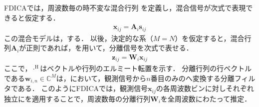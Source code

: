 FDICAでは，周波数毎の時不変な混合行列 を定義し，混合信号が次式で表現できると仮定する．
\begin{align}
 \bm{x}_{ij} = \bm{A}_i\bm{s}_{ij}
\end{align}
この混合モデルは，する．
以後，決定的な系（$M=N$）を仮定すると，混合行列$\bm{A}_{i}$が正則であれば，を用いて，分離信号を次式で表せる．
\begin{align}
 \bm{z}_{ij} = \bm{W}_{i}\bm{x}_{ij} \label{eq:sep}
\end{align}
ここで，$\cdot^\mathrm{H}$はベクトルや行列のエルミート転置を示す．
分離行列の行ベクトルである$\bm{w}_{i,n}\in\mathbb{C}^M$は，において，観測信号から$n$番目のみのへ変換する分離フィルタである．
このようにFDICAでは，観測信号$\bm{x}_{ij}$の各周波数ビンに対しそれぞれ独立にを適用することで，周波数毎の分離行列$\bm{W}_{i}$を全周波数にわたって推定．

